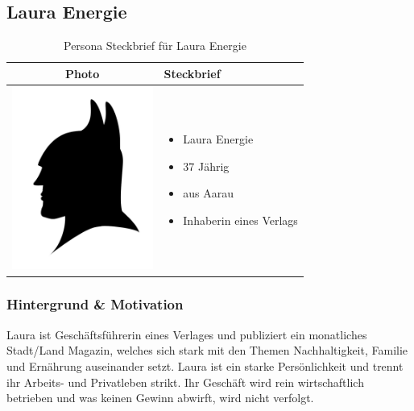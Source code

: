 \subsection{Laura Energie}
\begin{table}[h!]
  \centering
  \begin{tabular}{ | c | m{5cm} | }
    \hline
    Photo & Steckbrief \\ \hline
    \begin{minipage}{.3\textwidth}
      \includegraphics[width=\linewidth, height=60mm]{images/batman.jpg}
    \end{minipage}
    &
      \begin{itemize}
        \item Laura Energie
        \item 37 Jährig
        \item aus Aarau
        \item Inhaberin eines Verlags
      \end{itemize}
    \\ \hline
  \end{tabular}
  \caption{Persona Steckbrief für Laura Energie}\label{tbl:steckbrieflaura}
\end{table}

\subsubsection{Hintergrund \& Motivation}
Laura ist Geschäftsführerin eines Verlages und publiziert ein monatliches Stadt/Land Magazin, welches sich stark mit den Themen Nachhaltigkeit, Familie und Ernährung auseinander setzt. Laura ist ein starke Persönlichkeit und trennt ihr Arbeits- und Privatleben strikt. Ihr Geschäft wird rein wirtschaftlich betrieben und was keinen Gewinn abwirft, wird nicht verfolgt.

